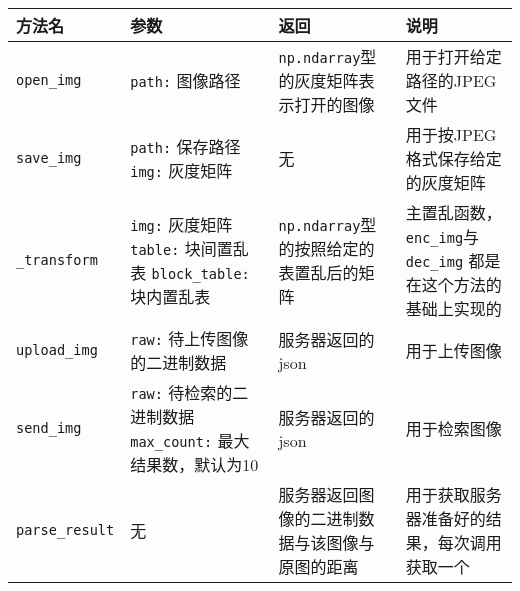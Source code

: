 \begin{table}[H]
  \centering
  \begin{tabular}[H]{| l | p{3.5cm} | p{3cm} | p{4cm} |}
    \hline
    方法名 & 参数 & 返回 & 说明 \\
    \hline
    \texttt{open\_img} & \texttt{path:} 图像路径
  & \texttt{np.ndarray}型的灰度矩阵表示打开的图像 & 用于打开给定路径的JPEG文件 \\
    \hline
    \texttt{save\_img} & \texttt{path:} 保存路径\newline
    \texttt{img:} 灰度矩阵 & 无 & 用于按JPEG格式保存给定的灰度矩阵 \\
    \hline
    \texttt{\_transform} & \texttt{img:} 灰度矩阵\newline
                           \texttt{table:} 块间置乱表\newline
                           \texttt{block\_table:} 块内置乱表\newline
  & \texttt{np.ndarray}型的按照给定的表置乱后的矩阵 & 主置乱函数，\newline
    \texttt{enc\_img}与\texttt{dec\_img}\newline
    都是在这个方法的基础上实现的 \\
    \hline
    \texttt{upload\_img} & \texttt{raw:} 待上传图像的二进制数据
  & 服务器返回的json & 用于上传图像 \\
    \hline
    \texttt{send\_img} & \texttt{raw:} 待检索的二进制数据\newline
                         \texttt{max\_count:} 最大结果数，默认为10
  & 服务器返回的json & 用于检索图像 \\
    \hline
    \texttt{parse\_result} & 无 & 服务器返回图像的二进制数据与该图像与
    原图的距离 & 用于获取服务器准备好的结果，每次调用获取一个 \\
    \hline
  \end{tabular}
  \label{tab:client-core}
\end{table}

